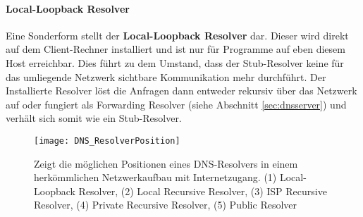 \paragraph{Local-Loopback Resolver}
Eine Sonderform stellt der \textbf{Local-Loopback Resolver} dar. Dieser wird direkt auf dem Client-Rechner installiert und ist nur für Programme auf eben diesem Host erreichbar. Dies führt zu dem Umstand, dass der Stub-Resolver keine für das umliegende Netzwerk sichtbare Kommunikation mehr durchführt. Der Installierte Resolver löst die Anfragen dann entweder rekursiv über das Netzwerk auf oder fungiert als Forwarding Resolver (siehe Abschnitt \ref{sec:dnsserver}) und verhält sich somit wie ein Stub-Resolver.

\begin{figure}[htbp]
    \centering
    \texttt{[image: DNS\_ResolverPosition]}
    \caption[Darstellung möglicher DNS-Resolver positionen im Netzwerk]{Zeigt die möglichen Positionen eines DNS-Resolvers in einem herkömmlichen Netzwerkaufbau mit Internetzugang. (1) Local-Loopback Resolver, (2) Local Recursive Resolver, (3) ISP Recursive Resolver, (4) Private Recursive Resolver, (5) Public Resolver}
    \label{img:dnsresolverposition}
\end{figure}
